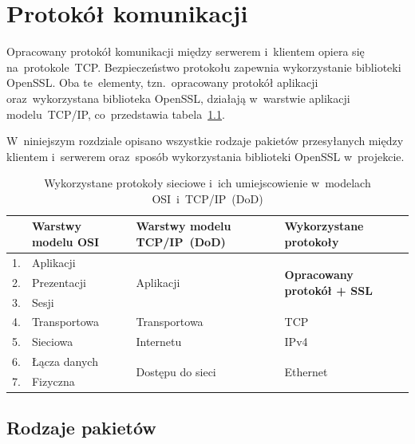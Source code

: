 \documentclass[thesis]{subfiles}
\begin{document}
\chapter{Protokół komunikacji}
\label{chapter:protokol}

Opracowany protokół komunikacji między serwerem i~klientem opiera się na~protokole~TCP. Bezpieczeństwo protokołu zapewnia wykorzystanie biblioteki OpenSSL. Oba te~elementy, tzn.~opracowany protokół aplikacji oraz~wykorzystana biblioteka OpenSSL, działają w~warstwie aplikacji modelu~TCP/IP, co~przedstawia tabela~\ref{fig:protocol-big-view}.

W~niniejszym rozdziale opisano wszystkie rodzaje pakietów przesyłanych między klientem i~serwerem oraz~sposób wykorzystania biblioteki OpenSSL w~projekcie.

\begin{table}
\renewcommand{\arraystretch}{1.5}
\begin{tabular}{l|l|l|l}
	   & Warstwy modelu OSI & Warstwy modelu TCP/IP~(DoD)       & Wykorzystane protokoły \\\hline\hline
	1. & Aplikacji          & \multirow{3}{*}{Aplikacji}        & \multirow{3}{*}{\parbox{3cm}{\textbf{Opracowany protokół + SSL}}} \\\cline{1-2}
	2. & Prezentacji        &                                   & \\\cline{1-2}
	3. & Sesji              &                                   & \\\hline
	4. & Transportowa       & Transportowa                      & TCP \\\hline
	5. & Sieciowa           & Internetu                         & IPv4 \\\hline
	6. & Łącza danych       & \multirow{2}{*}{Dostępu do sieci} & \multirow{2}{*}{Ethernet} \\\cline{1-2}
	7. & Fizyczna           &                                   &
\end{tabular}
\caption{Wykorzystane protokoły sieciowe i~ich umiejscowienie w~modelach OSI~i~TCP/IP~(DoD)}
\label{fig:protocol-big-view}
\end{table}


\section{Rodzaje pakietów}
\end{document}

